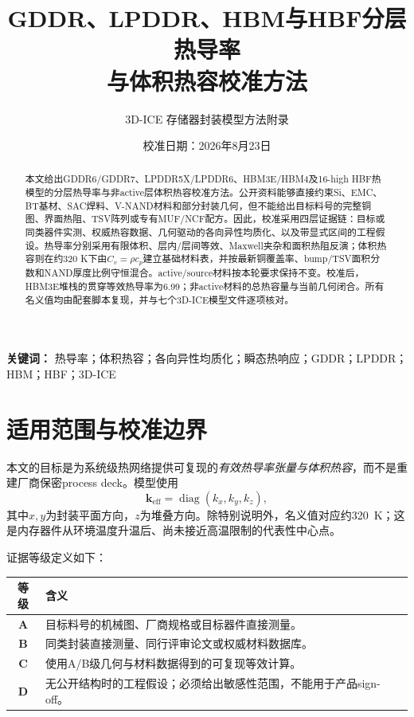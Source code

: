 \documentclass[UTF8,zihao=-4]{ctexart}
\title{GDDR、LPDDR、HBM与HBF分层热导率\\与体积热容校准方法}
\author{3D-ICE 存储器封装模型方法附录}
\date{校准日期：2026年8月23日}
\newcommand{\kvec}{\bm{k}_{\mathrm{eff}}}
\begin{document}
\maketitle

\begin{abstract}
本文给出GDDR6/GDDR7、LPDDR5X/LPDDR6、HBM3E/HBM4及16-high HBF热模型的分层热导率与非active层体积热容校准方法。公开资料能够直接约束Si、EMC、BT基材、SAC焊料、V-NAND材料和部分封装几何，但不能给出目标料号的完整铜图、界面热阻、TSV阵列或专有MUF/NCF配方。因此，校准采用四层证据链：目标或同类器件实测、权威热容数据、几何驱动的各向异性均质化、以及带显式区间的工程假设。热导率分别采用有限体积、层内/层间等效、Maxwell夹杂和面积热阻反演；体积热容则在约320 K下由$C_v=\rho c_p$建立基础材料表，并按最新铜覆盖率、bump/TSV面积分数和NAND厚度比例守恒混合。active/source材料按本轮要求保持不变。校准后，HBM3E堆栈的贯穿等效热导率为\SI{6.99}{\tcond}；非active材料的总热容量与当前几何闭合。所有名义值均由配套脚本复现，并与七个3D-ICE模型文件逐项核对。
\end{abstract}

\noindent\textbf{关键词：} 热导率；体积热容；各向异性均质化；瞬态热响应；GDDR；LPDDR；HBM；HBF；3D-ICE

\tableofcontents

\section{适用范围与校准边界}

本文的目标是为系统级热网络提供可复现的\emph{有效热导率张量与体积热容}，而不是重建厂商保密process deck。模型使用
\begin{equation}
  \kvec=\operatorname{diag}(k_x,k_y,k_z),
\end{equation}
其中$x,y$为封装平面方向，$z$为堆叠方向。除特别说明外，名义值对应约\SI{320}{\kelvin}；这是内存器件从环境温度升温后、尚未接近高温限制的代表性中心点。

证据等级定义如下：

\begin{center}
\begin{tabularx}{0.94\textwidth}{>{\bfseries}c X}
\toprule
等级 & 含义 \\
\midrule
A & 目标料号的机械图、厂商规格或目标器件直接测量。\\
B & 同类封装直接测量、同行评审论文或权威材料数据库。\\
C & 使用A/B级几何与材料数据得到的可复现等效计算。\\
D & 无公开结构时的工程假设；必须给出敏感性范围，不能用于产品sign-off。\\
\bottomrule
\end{tabularx}
\end{center}
\end{document}
